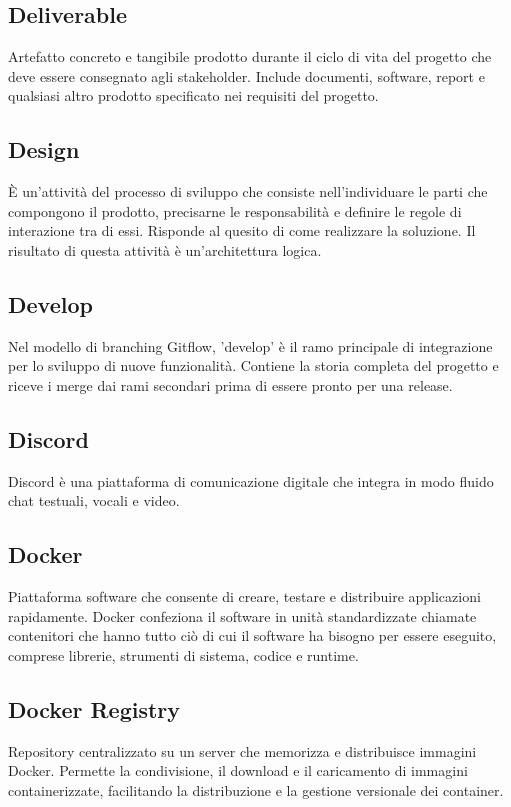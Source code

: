 \documentclass[10pt, letterpaper]{article}
\begin{document}
\subsection*{Deliverable}
Artefatto concreto e tangibile prodotto durante il ciclo di vita del progetto che deve essere consegnato agli stakeholder. Include documenti, software, report e
qualsiasi altro prodotto specificato nei requisiti del progetto.

\subsection*{Design}
È un'attività del processo di sviluppo che consiste nell'individuare le parti che compongono il prodotto, precisarne le responsabilità e definire le regole di interazione tra di essi. Risponde al quesito di come realizzare la soluzione. Il risultato di questa attività è un'architettura logica.

\subsection*{Develop}
Nel modello di branching Gitflow, 'develop' è il ramo principale di integrazione per lo sviluppo di nuove funzionalità. Contiene la storia completa del progetto
e riceve i merge dai rami secondari prima di essere pronto per una release.

\subsection*{Discord}
Discord è una piattaforma di comunicazione digitale che integra in modo fluido chat testuali, vocali e video.

\subsection*{Docker}
Piattaforma software che consente di creare, testare e distribuire applicazioni rapidamente. Docker confeziona il software in unità standardizzate chiamate contenitori
che hanno tutto ciò di cui il software ha bisogno per essere eseguito, comprese librerie, strumenti di sistema, codice e runtime.

\subsection*{Docker Registry}
Repository centralizzato su un server che memorizza e distribuisce immagini Docker.
Permette la condivisione, il download e il caricamento di immagini containerizzate, facilitando
la distribuzione e la gestione versionale dei container.
\end{document}
